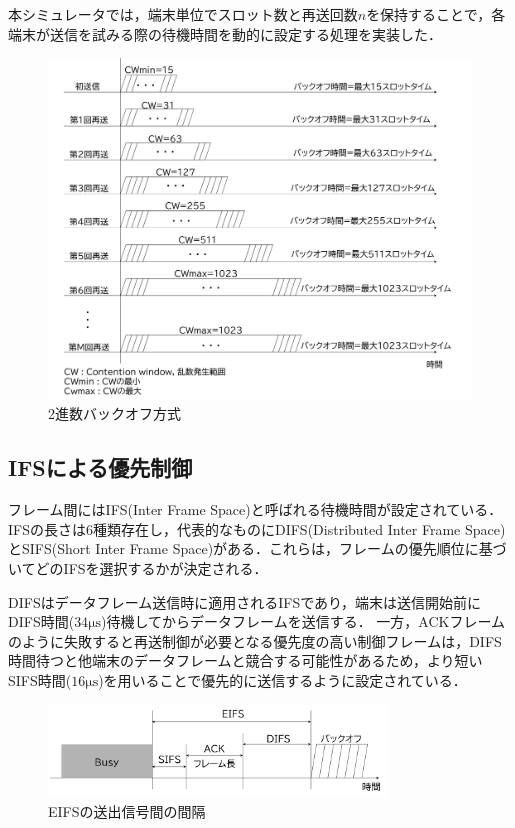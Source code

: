 \documentclass[a4paper,10pt]{ltjsarticle}
\begin{document}
本シミュレータでは，端末単位でスロット数と再送回数$n$を保持することで，各端末が送信を試みる際の待機時間を動的に設定する処理を実装した．

\begin{figure}[H]
  \centering
  \includegraphics[width=\textwidth]{./assets/CW_.png}
  \caption{2進数バックオフ方式}
  \label{binary-backoff}
\end{figure}

\clearpage

\subsection{IFSによる優先制御}

フレーム間にはIFS(Inter Frame Space)と呼ばれる待機時間が設定されている．IFSの長さは6種類存在し，代表的なものにDIFS(Distributed Inter Frame Space)とSIFS(Short Inter Frame Space)がある．これらは，フレームの優先順位に基づいてどのIFSを選択するかが決定される．

DIFSはデータフレーム送信時に適用されるIFSであり，端末は送信開始前にDIFS時間($34\mathrm{\mu s}$)待機してからデータフレームを送信する．
一方，ACKフレームのように失敗すると再送制御が必要となる優先度の高い制御フレームは，DIFS時間待つと他端末のデータフレームと競合する可能性があるため，より短いSIFS時間($16\mathrm{\mu s}$)を用いることで優先的に送信するように設定されている．

\begin{figure}[H]
  \centering
  \includegraphics[width=0.8\textwidth]{./assets/EIFS.png}
  \caption{EIFSの送出信号間の間隔}
  \label{eifs}
\end{figure}
\end{document}
